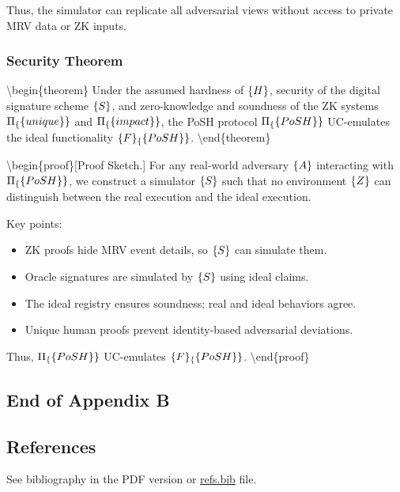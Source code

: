 \documentclass{article}
\begin{document}
Thus, the simulator can replicate all adversarial views without access
to private MRV data or ZK inputs.

\subsubsection{Security Theorem}

{\textbackslash}begin\{theorem\}
Under the assumed hardness of $\mathcal\{H\}$, security of the digital signature
scheme $\mathcal\{S\}$, and zero-knowledge and soundness of the ZK systems
$\Pi_\{\textsf\{unique\}\}$ and $\Pi_\{\textsf\{impact\}\}$, the PoSH protocol
$\Pi_\{\textsf\{PoSH\}\}$ UC-emulates the ideal functionality
$\mathcal\{F\}_\{\textsf\{PoSH\}\}$.
{\textbackslash}end\{theorem\}

{\textbackslash}begin\{proof\}[Proof Sketch.]
For any real-world adversary $\mathcal\{A\}$ interacting with
$\Pi_\{\textsf\{PoSH\}\}$, we construct a simulator $\mathcal\{S\}$ such that no
environment $\mathcal\{Z\}$ can distinguish between the real execution and the
ideal execution.

Key points:

\begin{itemize}
\item ZK proofs hide MRV event details, so $\mathcal\{S\}$ can simulate them.
\item Oracle signatures are simulated by $\mathcal\{S\}$ using ideal claims.
\item The ideal registry ensures soundness; real and ideal behaviors agree.
\item Unique human proofs prevent identity-based adversarial deviations.
\end{itemize}

Thus, $\Pi_\{\textsf\{PoSH\}\}$ UC-emulates $\mathcal\{F\}_\{\textsf\{PoSH\}\}$.
{\textbackslash}end\{proof\}

\subsection{End of Appendix B}

\subsection{References}

See bibliography in the PDF version or \href{/refs-3371cda8e4dc6e9018dddb447c1c4570.bib}{refs.bib} file.
\end{document}
